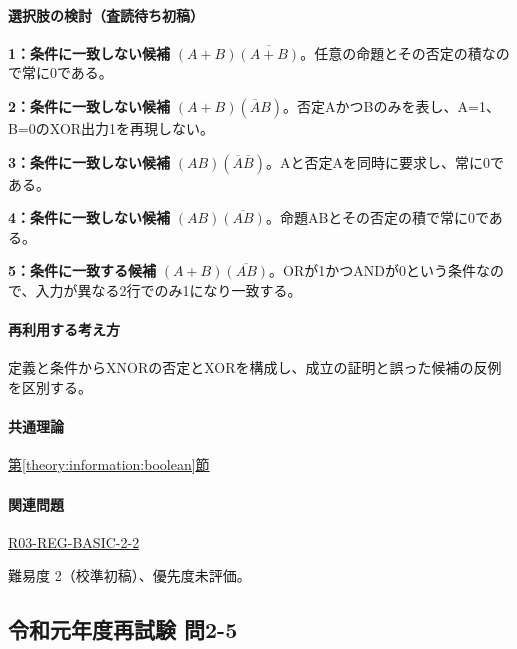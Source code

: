 \paragraph{選択肢の検討（査読待ち初稿）}\mbox{}\par

\noindent\textbf{1：条件に一致しない候補} \((A+B)\overline{(A+B)}\)。任意の命題とその否定の積なので常に0である。\par

\noindent\textbf{2：条件に一致しない候補} \((A+B)(\overline A B)\)。否定AかつBのみを表し、A=\allowbreak{}1、B=\allowbreak{}0のXOR出力1を再現しない。\par

\noindent\textbf{3：条件に一致しない候補} \((AB)(\overline A\overline B)\)。Aと否定Aを同時に要求し、常に0である。\par

\noindent\textbf{4：条件に一致しない候補} \((AB)\overline{(AB)}\)。命題ABとその否定の積で常に0である。\par

\noindent\textbf{5：条件に一致する候補} \((A+B)\overline{(AB)}\)。ORが1かつANDが0という条件なので、入力が異なる2行でのみ1になり一致する。\par

\paragraph{再利用する考え方} 定義と条件からXNORの否定とXORを構成し、成立の証明と誤った候補の反例を区別する。

\paragraph{共通理論} \hyperref[theory:information:boolean]{第\ref*{theory:information:boolean}節}

\paragraph{関連問題} \hyperref[q:r03-reg-basic-2-2]{R03-REG-BASIC-2-2}

\par 難易度 2（校準初稿）、優先度未評価。

\subsection{令和元年度再試験 問2-5}
\label{q:r01-ret-basic-2-5}

